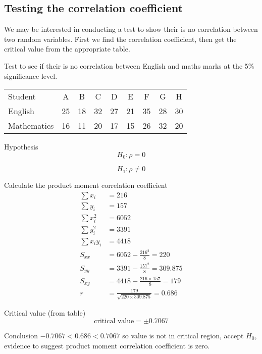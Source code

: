     \subsection{Testing the correlation coefficient}
        We may be interested in conducting a test to show their is no correlation between two random variables. First we find the correlation coefficient, then get the critical value from the appropriate table.

        \begin{example}
        {
            Test to see if their is no correlation between English and maths marks at the 5\% significance level.

            \begin{center}
            \begin{tabular}{l|c|c|c|c|c|c|c|c}
            Student        & A  & B  & C  & D  & E  & F  & G  & H  \\
            English        & 25 & 18 & 32 & 27 & 21 & 35 & 28 & 30 \\
            Mathematics    & 16 & 11 & 20 & 17 & 15 & 26 & 32 & 20 \\
            \end{tabular}
            \end{center}
        }

        \begin{step}{Hypothesis} 
        $$H_0: \rho = 0$$

        $$H_1: \rho \ne 0$$
        \end{step}

        \begin{step}{Calculate the product moment correlation coefficient}
        \begin{align*}
        \sum{x_i} &= 216\\
        \sum{y_i} &= 157\\
        \sum{x_i^2} &= 6052\\
        \sum{y_i^2} &= 3391\\
        \sum{x_i y_i} &= 4418\\
        S_{xx} &= 6052 - \frac{216^2}{8} = 220\\
        S_{yy} &= 3391 - \frac{157^2}{8} = 309.875\\
        S_{xy} &= 4418 - \frac{216 \times 157}{8} = 179\\
        r &= \frac{179}{\sqrt{220 \times 309.875}} = 0.686
        \end{align*}
        \end{step}

        \begin{step}{Critical value (from table)}
        $$
        \text{critical value} = \pm 0.7067
        $$
        \end{step}

        \begin{step}{Conclusion}
        $-0.7067 < 0.686 < 0.7067$ so value is not in critical region, accept $H_0$, evidence to suggest product moment correlation coefficient is zero.
        \end{step}

        \end{example}